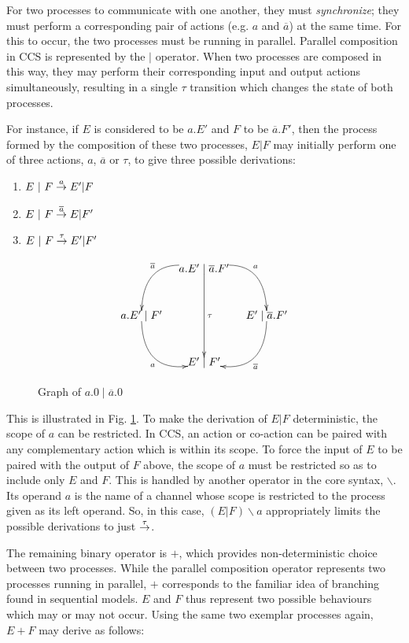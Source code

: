 For two processes to communicate with one another, they must
\emph{synchronize}; they must perform a corresponding pair of actions
(e.g. $a$ and $\overline{a}$) at the same time.  For this to occur,
the two processes must be running in parallel.  Parallel composition
in CCS is represented by the $|$ operator.  When two processes are
composed in this way, they may perform their corresponding input and
output actions simultaneously, resulting in a single $\tau$ transition
which changes the state of both processes.

For instance, if $E$ is considered to be $a.E'$ and $F$ to be
$\overline{a}.F'$, then the process formed by the composition of these
two processes, $E|F$ may initially perform one of three actions, $a$,
$\overline{a}$ or $\tau$, to give three possible derivations:

\begin{enumerate}
\item $E\ |\ F \stackrel{a}{\rightarrow} E'|F$
\item $E\ |\ F \stackrel{\overline{a}}{\rightarrow} E|F'$
\item $E\ |\ F \stackrel{\tau}{\rightarrow} E'|F'$
\end{enumerate}

\begin{figure}  
  \centering
\[
\xy
(20,0)*{a.E' \mid \overline{a}.F'}="1";
(0,-15)*{a.E' \mid F'}="2";
(40,-15)*{E' \mid \overline{a}.F'}="3";
(20,-30)*{E' \mid F'}="4";
{\ar@/^2pc/^{a} "1";"3"};
{\ar@/_2pc/_{\overline{a}} "1";"2"};
{\ar@/^2pc/^{\overline{a}} "3";"4"};
{\ar@/_2pc/_{a} "2";"4"};
{\ar^{\tau} "1";"4"};
\endxy
\]
  \caption{Graph of $a.0 \mid \overline{a}.0$}
  \label{fig:graph1}
\end{figure}

This is illustrated in Fig. \ref{fig:graph1}.  To make the derivation
of $E|F$ deterministic, the scope of $a$ can be restricted.  In CCS,
an action or co-action can be paired with any complementary action
which is within its scope.  To force the input of $E$ to be paired
with the output of $F$ above, the scope of $a$ must be restricted so
as to include only $E$ and $F$.  This is handled by another operator
in the core syntax, $\backslash$.  Its operand $a$ is the name of a
channel whose scope is restricted to the process given as its left
operand.  So, in this case, $(E|F)\backslash a$ appropriately limits
the possible derivations to just $\stackrel{\tau}{\rightarrow}$.

The remaining binary operator is $+$, which provides non-deterministic
choice between two processes.  While the parallel composition operator
represents two processes running in parallel, $+$ corresponds to the
familiar idea of branching found in sequential models.  $E$ and $F$
thus represent two possible behaviours which may or may not occur.
Using the same two exemplar processes again, $E + F$ may derive as
follows:

